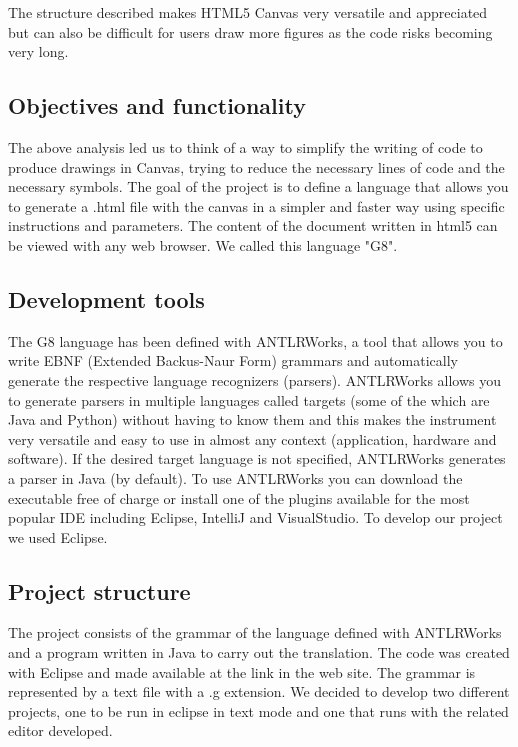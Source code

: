 \documentclass[a4paper]{article}
\begin{document}
The structure described makes HTML5 Canvas very versatile and appreciated but can also be difficult for
users draw more figures as the code risks becoming very long.

\vspace{2\baselineskip}

\subsection{Objectives and functionality}

The above analysis led us to think of a way to simplify the writing of
code to produce drawings in Canvas, trying to reduce the necessary lines of code and the necessary symbols.
The goal of the project is to define a language that allows you to generate a .html file with the canvas in a simpler and faster way using specific instructions and parameters.
The content of the document written in html5 can be viewed with any web browser.
We called this language "G8".

\newpage

\subsection{Development tools}
The G8 language has been defined with ANTLRWorks, a tool that allows you to write EBNF (Extended Backus-Naur Form) grammars and automatically generate the respective language recognizers (parsers).
ANTLRWorks allows you to generate parsers in multiple languages called targets (some of the which are Java and Python) without having to know them and this makes the instrument very versatile and easy to use in almost any
context (application, hardware and software).
If the desired target language is not specified, ANTLRWorks generates a parser in Java (by default).
To use ANTLRWorks you can download the executable free of charge or install one of the plugins available for the most popular IDE including Eclipse, IntelliJ and VisualStudio.
To develop our project we used Eclipse.

\subsection{Project structure}


The project consists of the grammar of the language defined with ANTLRWorks and a
program written in Java to carry out the translation.
The code was created with Eclipse and made available at the link in the web site.
The grammar is represented by a text file with a .g extension.
We decided to develop two different projects, one to be run in eclipse in text mode and one that runs with the related editor developed.
\end{document}
